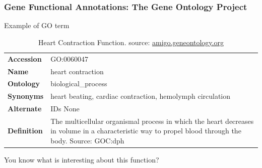 \documentclass[aspectratio=169, 9pt, handout]{beamer}\usepackage[]{graphicx}\usepackage[]{color}
\begin{document}
\begin{frame}
\frametitle{Gene Functional Annotations: The Gene Ontology Project}

Example of GO term

\begin{table}
\footnotesize
\begin{tabular}{lm{.6\linewidth}}
\toprule
\textbf{Accession} & GO:0060047 \\
\textbf{Name} & heart contraction \\
\textbf{Ontology} & biological\_process \\
\textbf{Synonyms} & heart beating, cardiac contraction, hemolymph circulation \\
\textbf{Alternate} & IDs None \\
\textbf{Definition} & The multicellular organismal process in which the heart decreases in volume in a 
characteristic way to propel blood through the body. Source: GOC:dph \\
\bottomrule
\end{tabular}
\caption{Heart Contraction Function. source: \href{http://amigo.geneontology.org/amigo/term/GO:0060047}{amigo.geneontology.org}}
\end{table}\pause

You know what is interesting about this function?

\end{frame}
\end{document}
